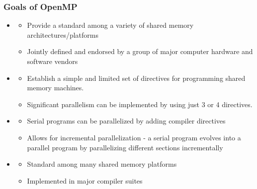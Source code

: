 \documentclass[10pt,t]{beamer}
\begin{document}
\begin{frame}
  \frametitle{Goals of OpenMP}
  \vspace{-0.5cm}
  \begin{block}{}
    \begin{itemize}
      \item {}
        \begin{itemize}
        \item Provide a standard among a variety of shared memory architectures/platforms
        \item Jointly defined and endorsed by a group of major computer hardware and software vendors
        \end{itemize}
      \item {}
        \begin{itemize}
        \item Establish a simple and limited set of directives for programming shared memory machines.
        \item Significant parallelism can be implemented by using just 3 or 4 directives.
        \end{itemize}
      \item {}
      \begin{itemize}
        \item Serial programs can be parallelized by adding compiler directives
        \item Allows for incremental parallelization - a serial program evolves into a parallel program by parallelizing different sections incrementally
      \end{itemize}
      \item {}
      \begin{itemize}
        \item Standard among many shared memory platforms
        \item Implemented in major compiler suites
      \end{itemize}
    \end{itemize}
  \end{block}
\end{frame}
\end{document}
